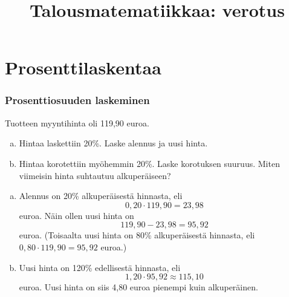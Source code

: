 \documentclass[]{beamer}\usepackage[]{graphicx}\usepackage[]{color}
\title{Talousmatematiikkaa: verotus}
\newcommand{\socrativeOhje}{
\begin{itemize}
\item Surffaa osoitteeseen \url{m.socrative.com} (tai \url{socrative.com})
\item Siirry huoneeseen nimeltä \url{hruoho}
\end{itemize}
}
\begin{document}
\begin{frame}
\maketitle
\end{frame}
\begin{frame}
\tableofcontents
\end{frame}


\section{Prosenttilaskentaa}
\begin{frame}
\frametitle{Prosenttiosuuden laskeminen}
	\begin{esim}
		Tuotteen myyntihinta oli 119,90 euroa. 
		\begin{enumerate}[(a)]
			\item Hintaa laskettiin 20\%. Laske alennus ja uusi hinta.
			\item Hintaa korotettiin myöhemmin 20\%. Laske korotuksen suuruus. Miten viimeisin hinta suhtautuu alkuperäiseen?
		\end{enumerate}
	\end{esim}
\end{frame}
\begin{frame}
	\begin{ratkaisu}
		\begin{enumerate}[(a)]
			\item Alennus on 20\% alkuperäisestä hinnasta\pause , eli 
			\[
			0,20\cdot119,90 = 23,98
			\] euroa. \pause Näin ollen uusi hinta on 
			\[
			119,90-23,98 = 95,92
			\] euroa. \pause (Toisaalta uusi hinta on 80\% alkuperäisestä hinnasta, eli \(
			0,80\cdot 119,90 = 95,92\) euroa.)
			\item \pause Uusi hinta on 120\% edellisestä hinnasta\pause , eli
			\[
			1,20\cdot95,92\approx 115,10
			\] euroa. \pause Uusi hinta on siis 4,80 euroa pienempi kuin alkuperäinen.
		\end{enumerate}
	\end{ratkaisu}
\end{frame}
\end{document}
